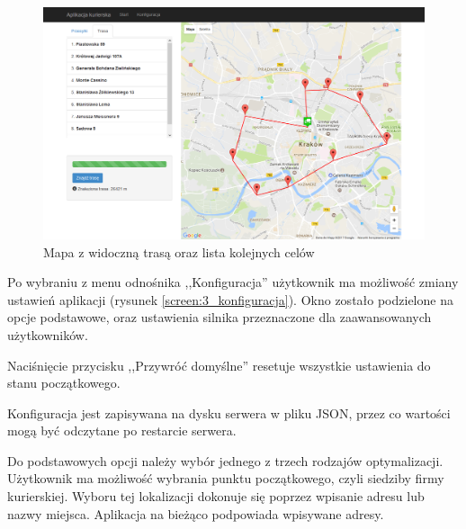 \begin{figure}
	\centering
	\includegraphics[width=0.7\linewidth]{screen/2_po_wyszukaniu}
	\caption{Mapa z widoczną trasą oraz lista kolejnych celów}
	\label{screen:2_po_wyszukaniu}
\end{figure}

Po wybraniu z menu odnośnika ,,Konfiguracja'' użytkownik ma możliwość zmiany ustawień aplikacji (rysunek \ref{screen:3_konfiguracja}). Okno zostało podzielone na opcje podstawowe, oraz ustawienia silnika przeznaczone dla zaawansowanych użytkowników.

Naciśnięcie przycisku ,,Przywróć domyślne'' resetuje wszystkie ustawienia do stanu początkowego.

Konfiguracja jest zapisywana na dysku serwera w pliku JSON, przez co wartości mogą być odczytane po restarcie serwera.

Do podstawowych opcji należy wybór jednego z trzech rodzajów optymalizacji. Użytkownik ma możliwość wybrania punktu początkowego, czyli siedziby firmy kurierskiej. Wyboru tej lokalizacji dokonuje się poprzez wpisanie adresu lub nazwy miejsca. Aplikacja na bieżąco podpowiada wpisywane adresy.

